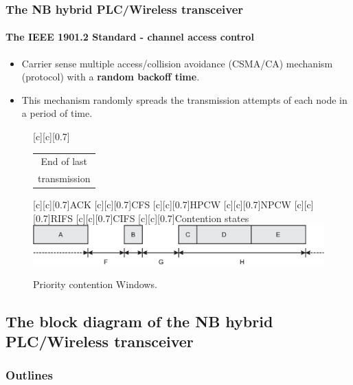 \documentclass[mathserif]{beamer}
\newcommand{\wait}{\vfill}
\begin{document}
\begin{frame}
	\frametitle{The NB hybrid PLC/Wireless transceiver}
	\framesubtitle{The IEEE 1901.2 Standard - channel access control}
	\begin{itemize}
		\item Carrier sense multiple access/collision avoidance (CSMA/CA) mechanism (protocol) with a \textbf{random backoff time}. \wait
		\item This mechanism randomly spreads the transmission attempts of each node in a period of time. \wait
	\end{itemize}
	\renewcommand{\sizeLetter}{0.7}
	\begin{figure}[ht]
		[0.7]{\begin{tabular}{@{}c@{}}
				End of last\\ 
				transmission
		\end{tabular} }
		[\sizeLetter]{ACK}
		[\sizeLetter]{CFS}
		[\sizeLetter]{HPCW}
		[\sizeLetter]{NPCW}
		[\sizeLetter]{RIFS}
		[\sizeLetter]{CIFS}
		[\sizeLetter]{Contention states}
		\centering
		\includegraphics[width=\linewidth]{figuras/cw}
		\caption{Priority contention Windows.}
		\label{fig:cw}
	\end{figure}
\end{frame}


\subsection{The block diagram of the NB hybrid PLC/Wireless transceiver}
\begin{frame}
\frametitle{Outlines}
\small
\tableofcontents[currentsubsection]
\end{frame}
\end{document}
